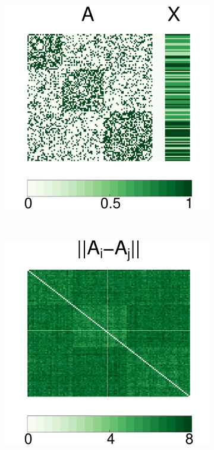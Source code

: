 \documentclass[12pt]{article}
\theoremstyle{definition}
\begin{document}
\begin{figure}[H]
\begin{subfigure}[b]{0.23\textwidth}
		\includegraphics[width=\textwidth]{../Figure/Amat.pdf}
			\caption{}
		\label{fig:b}
	\end{subfigure}
	~ %
	\begin{subfigure}[b]{0.23\textwidth}
		\includegraphics[width=\textwidth]{../Figure/distA.pdf}

\end{subfigure}
\end{figure}
\end{document}
